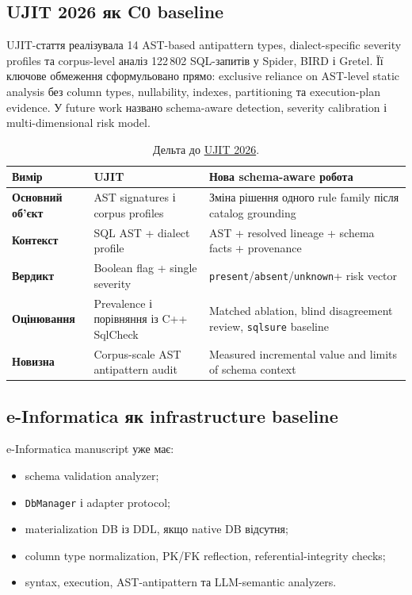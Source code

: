 \documentclass[11pt,a4paper]{article}
\newcommand{\unknown}{\texttt{unknown}}
\newcommand{\presentstate}{\texttt{present}}
\newcommand{\absentstate}{\texttt{absent}}
\begin{document}
\subsection{UJIT 2026 як C0 baseline}

UJIT-стаття реалізувала 14 AST-based antipattern types, dialect-specific severity
profiles та corpus-level аналіз 122\,802 SQL-запитів у Spider, BIRD і Gretel.
Її ключове обмеження сформульовано прямо: exclusive reliance on AST-level static
analysis без column types, nullability, indexes, partitioning та execution-plan
evidence. У future work названо schema-aware detection, severity calibration і
multi-dimensional risk model.

\begin{table}[h]
\centering
\small
\begin{tabularx}{\textwidth}{>{\bfseries}p{3.2cm}YY}
\toprule
Вимір & UJIT & Нова schema-aware робота \\
\midrule
Основний об'єкт &
AST signatures і corpus profiles &
Зміна рішення одного rule family після catalog grounding \\
Контекст &
SQL AST + dialect profile &
AST + resolved lineage + schema facts + provenance \\
Вердикт &
Boolean flag + single severity &
\presentstate/\absentstate/\unknown + risk vector \\
Оцінювання &
Prevalence і порівняння із C++ SqlCheck &
Matched ablation, blind disagreement review, \texttt{sqlsure} baseline \\
Новизна &
Corpus-scale AST antipattern audit &
Measured incremental value and limits of schema context \\
\bottomrule
\end{tabularx}
\caption{Дельта до \href{https://doi.org/10.23939/ujit2026.01.135}{UJIT 2026}.}
\end{table}

\subsection{e-Informatica як infrastructure baseline}

e-Informatica manuscript уже має:

\begin{itemize}
\item schema validation analyzer;
\item \texttt{DbManager} і adapter protocol;
\item materialization DB із DDL, якщо native DB відсутня;
\item column type normalization, PK/FK reflection, referential-integrity checks;
\item syntax, execution, AST-antipattern та LLM-semantic analyzers.
\end{itemize}
\end{document}
